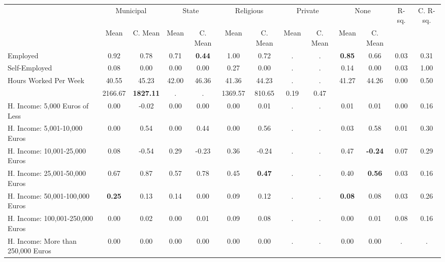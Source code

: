 \begin{tabular}{l c c c c c c c c c c c c}
\toprule
& \multicolumn{2}{c}{Municipal} & \multicolumn{2}{c}{State} & \multicolumn{2}{c}{Religious} & \multicolumn{2}{c}{Private} & \multicolumn{2}{c}{None} & R-sq. & C. R-sq. \\
& \scriptsize Mean & \scriptsize C. Mean & \scriptsize Mean & \scriptsize C. Mean & \scriptsize Mean & \scriptsize C. Mean & \scriptsize Mean & \scriptsize C. Mean & \scriptsize Mean & \scriptsize C. Mean & & \\
\midrule
Employed &      0.92 & 0.78 &      0.71 & \textbf{     0.44} &      1.00 & 0.72 &         . & . & \textbf{     0.85} & 0.66 &      0.03 &      0.31 \\
Self-Employed &      0.08 & 0.00 &      0.00 & 0.00 &      0.27 & 0.00 &         . & . &      0.14 & 0.00 &      0.03 &      1.00 \\
Hours Worked Per Week &     40.55 & 45.23 &     42.00 & 46.36 &     41.36 & 44.23 &         . & . &     41.27 & 44.26 &      0.00 &      0.50 \\
&   2166.67 & \textbf{  1827.11} &         . & . &   1369.57 & 810.65 &      0.19 &      0.47 \\
H. Income: 5,000 Euros of Less &      0.00 & -0.02 &      0.00 & 0.00 &      0.00 & 0.01 &         . & . &      0.01 & 0.01 &      0.00 &      0.16 \\
H. Income: 5,001-10,000 Euros &      0.00 & 0.54 &      0.00 & 0.44 &      0.00 & 0.56 &         . & . &      0.03 & 0.58 &      0.01 &      0.30 \\
H. Income: 10,001-25,000 Euros &      0.08 & -0.54 &      0.29 & -0.23 &      0.36 & -0.24 &         . & . &      0.47 & \textbf{    -0.24} &      0.07 &      0.29 \\
H. Income: 25,001-50,000 Euros &      0.67 & 0.87 &      0.57 & 0.78 &      0.45 & \textbf{     0.47} &         . & . &      0.40 & \textbf{     0.56} &      0.03 &      0.16 \\
H. Income: 50,001-100,000 Euros & \textbf{     0.25} & 0.13 &      0.14 & 0.00 &      0.09 & 0.12 &         . & . & \textbf{     0.08} & 0.08 &      0.03 &      0.26 \\
H. Income: 100,001-250,000 Euros &      0.00 & 0.02 &      0.00 & 0.01 &      0.09 & 0.08 &         . & . &      0.00 & 0.01 &      0.08 &      0.16 \\
H. Income: More than 250,000 Euros &      0.00 & 0.00 &      0.00 & 0.00 &      0.00 & 0.00 &         . & . &      0.00 & 0.00 &         . &         . \\
\bottomrule
\end{tabular}
